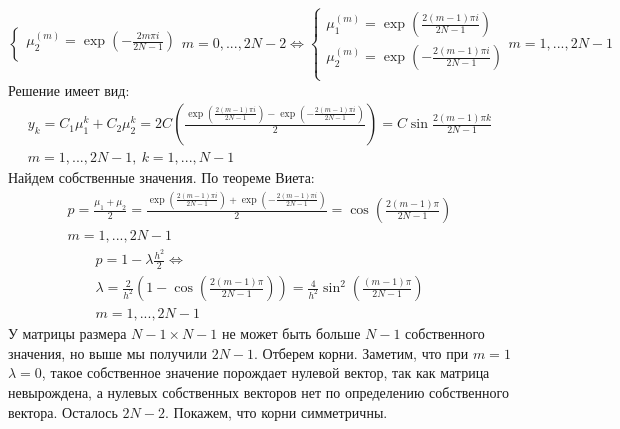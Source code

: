 \begin{task}
\begin{enumerate}
\begin{enumerate}
\[\begin{cases}
                      \mu_2^{(m)} = \exp\left(-\frac{2m\pi i}{2N-1}\right) \\
                    \end{cases} m = 0, ...,2N-2\Leftrightarrow
                    \begin{cases}
                      \mu_1^{(m)} = \exp\left(\frac{2(m-1)\pi i}{2N-1}\right)  \\
                      \mu_2^{(m)} = \exp\left(-\frac{2(m-1)\pi i}{2N-1}\right) \\
                    \end{cases} m = 1, ...,2N-1\]
                  Решение имеет вид:
                  \begin{multline*}
                    y_k=C_1\mu_1^k+C_2\mu_2^k=2C\left(\frac{\exp\left(\frac{2(m-1)\pi i}{2N-1}\right)-\exp\left(-\frac{2(m-1)\pi i}{2N-1}\right)}{2}\right) = C\sin\frac{2(m-1)\pi k}{2N-1}\\
                    m=1,...,2N-1,\ k=1,...,N-1
                  \end{multline*}
                  Найдем собственные значения. По теореме Виета:
                  \begin{multline*}
                    p=\frac{\mu_1+\mu_2}{2}=\frac{\exp\left(\frac{2(m-1)\pi i}{2N-1}\right) + \exp\left(-\frac{2(m-1)\pi i}{2N-1}\right)}{2}=\cos\left(\frac{2(m-1)\pi}{2N-1}\right)\\
                    m=1,...,2N-1
                  \end{multline*}
                  \begin{multline*}
                    p=1-\lambda\frac{h^2}{2}\Leftrightarrow\\\lambda=\frac{2}{h^2}\left(1-\cos\left(\frac{2(m-1)\pi}{2N-1}\right)\right)=\frac{4}{h^2}\sin^2\left(\frac{(m-1)\pi}{2N-1}\right)\\
                    m=1,...,2N-1
                  \end{multline*}
                  У матрицы размера $N-1\times N-1$ не может быть больше $N-1$ собственного значения, но выше мы получили $2N-1$. Отберем корни.
                  Заметим, что при $m=1$ $\lambda=0$, такое собственное значение порождает нулевой вектор, так как матрица невырождена, а нулевых
                  собственных векторов нет по определению собственного вектора. Осталось $2N-2$. Покажем,
                  что корни симметричны.


\end{enumerate}
\end{enumerate}
\end{task}
